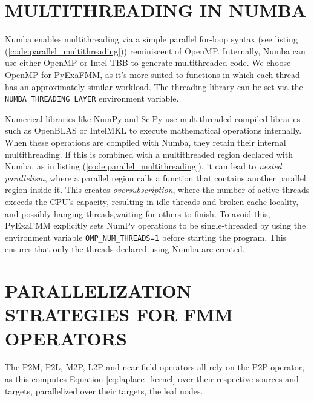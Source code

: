 \documentclass{IEEEcsmag}
\begin{document}
\section{MULTITHREADING IN NUMBA}

Numba enables multithreading via a simple parallel for-loop syntax (see listing (\ref{code:parallel_multithreading})) reminiscent of OpenMP. Internally, Numba can use either OpenMP or Intel TBB to generate multithreaded code. We choose OpenMP for PyExaFMM, as it's more suited to functions in which each thread has an approximately similar workload. The threading library can be set via the \lstinline{NUMBA_THREADING_LAYER} environment variable.

Numerical libraries like NumPy and SciPy use multithreaded compiled libraries such as OpenBLAS or IntelMKL to execute mathematical operations internally. When these operations are compiled with Numba, they retain their internal multithreading. If this is combined with a multithreaded region declared with Numba, as in listing (\ref{code:parallel_multithreading}), it can lead to \emph{nested parallelism}, where a parallel region calls a function that contains another parallel region inside it.
This creates \emph{oversubscription}, where the number of active threads exceeds the CPU's capacity, resulting in idle threads and broken cache locality, and possibly hanging threads,waiting for others to finish. To avoid this, PyExaFMM explicitly sets NumPy operations to be single-threaded by using the environment variable \lstinline{OMP_NUM_THREADS=1} before starting the program. This ensures that only the threads declared using Numba are created.




\section{PARALLELIZATION STRATEGIES FOR FMM OPERATORS}

The P2M, P2L, M2P, L2P and near-field operators all rely on the P2P operator, as this computes Equation \eqref{eq:laplace_kernel} over their respective sources and targets, parallelized over their targets, the leaf nodes.
\end{document}
